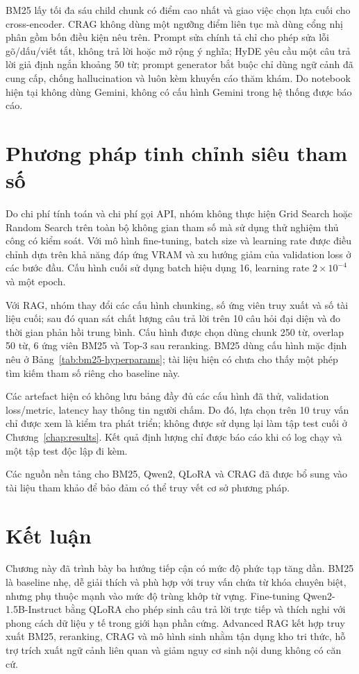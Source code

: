 \documentclass[12pt,a4paper,oneside]{report}
\begin{document}
BM25 lấy tối đa sáu child chunk có điểm cao nhất và giao việc chọn lựa cuối cho cross-encoder. CRAG không dùng một ngưỡng điểm liên tục mà dùng cổng nhị phân gồm bốn điều kiện nêu trên. Prompt sửa chính tả chỉ cho phép sửa lỗi gõ/dấu/viết tắt, không trả lời hoặc mở rộng ý nghĩa; HyDE yêu cầu một câu trả lời giả định ngắn khoảng 50 từ; prompt generator bắt buộc chỉ dùng ngữ cảnh đã cung cấp, chống hallucination và luôn kèm khuyến cáo thăm khám. Do notebook hiện tại không dùng Gemini, không có cấu hình Gemini trong hệ thống được báo cáo.

\section{Phương pháp tinh chỉnh siêu tham số}
Do chi phí tính toán và chi phí gọi API, nhóm không thực hiện Grid Search hoặc Random Search trên toàn bộ không gian tham số mà sử dụng thử nghiệm thủ công có kiểm soát. Với mô hình fine-tuning, batch size và learning rate được điều chỉnh dựa trên khả năng đáp ứng VRAM và xu hướng giảm của validation loss ở các bước đầu. Cấu hình cuối sử dụng batch hiệu dụng 16, learning rate $2\times10^{-4}$ và một epoch.

Với RAG, nhóm thay đổi các cấu hình chunking, số ứng viên truy xuất và số tài liệu cuối; sau đó quan sát chất lượng câu trả lời trên 10 câu hỏi đại diện và đo thời gian phản hồi trung bình. Cấu hình được chọn dùng chunk 250 từ, overlap 50 từ, 6 ứng viên BM25 và Top-3 sau reranking. BM25 dùng cấu hình mặc định nêu ở Bảng~\ref{tab:bm25-hyperparams}; tài liệu hiện có chưa cho thấy một phép tìm kiếm tham số riêng cho baseline này.

Các artefact hiện có không lưu bảng đầy đủ các cấu hình đã thử, validation loss/metric, latency hay thông tin người chấm. Do đó, lựa chọn trên 10 truy vấn chỉ được xem là kiểm tra phát triển; không được sử dụng lại làm tập test cuối ở Chương~\ref{chap:results}. Kết quả định lượng chỉ được báo cáo khi có log chạy và một tập test độc lập đi kèm.

Các nguồn nền tảng cho BM25, Qwen2, QLoRA và CRAG đã được bổ sung vào tài liệu tham khảo để bảo đảm có thể truy vết cơ sở phương pháp.

\section{Kết luận}
Chương này đã trình bày ba hướng tiếp cận có mức độ phức tạp tăng dần. BM25 là baseline nhẹ, dễ giải thích và phù hợp với truy vấn chứa từ khóa chuyên biệt, nhưng phụ thuộc mạnh vào mức độ trùng khớp từ vựng. Fine-tuning Qwen2-1.5B-Instruct bằng QLoRA cho phép sinh câu trả lời trực tiếp và thích nghi với phong cách dữ liệu y tế trong giới hạn phần cứng. Advanced RAG kết hợp truy xuất BM25, reranking, CRAG và mô hình sinh nhằm tận dụng kho tri thức, hỗ trợ trích xuất ngữ cảnh liên quan và giảm nguy cơ sinh nội dung không có căn cứ.
\end{document}
